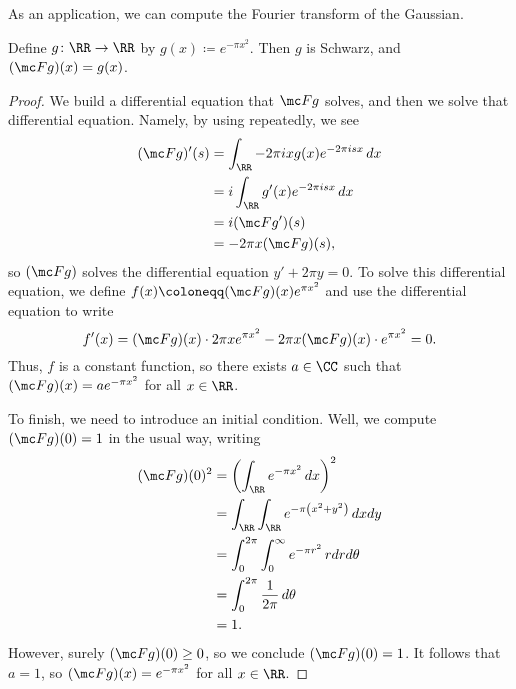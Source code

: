 \documentclass[notes.tex]{subfiles}
\begin{document}
As an application, we can compute the Fourier transform of the Gaussian.
\begin{exe}[Gaussian] \label{exe:gaussian}
	Define $g\colon\RR\to\RR$ by $g(x)\coloneqq e^{-\pi x^2}$. Then $g$ is Schwarz, and $(\mc Fg)(x)=g(x)$.
\end{exe}
\begin{proof}
	We build a differential equation that $\mc Fg$ solves, and then we solve that differential equation. Namely, by using  repeatedly, we see
	\begin{align*}
		(\mc Fg)'(s) &= \int_\RR-2\pi ixg(x)e^{-2\pi isx}\,dx \\
		&= i\int_\RR g'(x)e^{-2\pi isx}\,dx \\
		&= i(\mc Fg')(s) \\
		&= -2\pi x(\mc Fg)(s),
	\end{align*}
	so $(\mc Fg)$ solves the differential equation $y'+2\pi y=0$. To solve this differential equation, we define $f(x)\coloneqq(\mc Fg)(x)e^{\pi x^2}$ and use the differential equation to write
	\[f'(x)=(\mc Fg)(x)\cdot2\pi xe^{\pi x^2}-2\pi x(\mc Fg)(x)\cdot e^{\pi x^2}=0.\]
	Thus, $f$ is a constant function, so there exists $a\in\CC$ such that $(\mc Fg)(x)=ae^{-\pi x^2}$ for all $x\in\RR$.

	To finish, we need to introduce an initial condition. Well, we compute $(\mc Fg)(0)=1$ in the usual way, writing
	\begin{align*}
		(\mc Fg)(0)^2 &= \left(\int_\RR e^{-\pi x^2}\,dx\right)^2 \\
		&= \int_\RR\int_\RR e^{-\pi\left(x^2+y^2\right)}\,dxdy \\
		&= \int_0^{2\pi}\int_0^\infty e^{-\pi r^2}\,rdrd\theta \\
		&= \int_0^{2\pi}\frac1{2\pi}\,d\theta \\
		&= 1.
	\end{align*}
	However, surely $(\mc Fg)(0)\ge0$, so we conclude $(\mc Fg)(0)=1$. It follows that $a=1$, so $(\mc Fg)(x)=e^{-\pi x^2}$ for all $x\in\RR$.
\end{proof}
\end{document}
